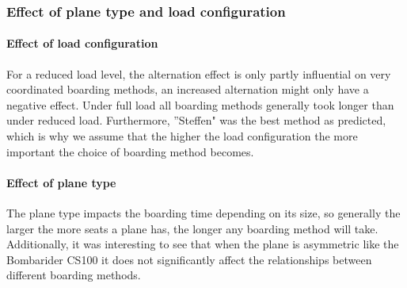 \documentclass[11pt]{article}
\begin{document}
 
 
 \subsubsection{Effect of plane type and load configuration}
 \paragraph{Effect of load configuration}
 For a reduced load level, the alternation effect is only partly influential on very coordinated boarding methods, an increased alternation might only have a negative effect. Under full load all boarding methods generally took longer than under reduced load. Furthermore, ''Steffen" was the best method as predicted, which is why we assume that the higher the load configuration the more important the choice of boarding method becomes.
 
 \paragraph{Effect of plane type}
 The plane type impacts the boarding time depending on its size, so generally the larger the more seats a plane has, the longer any boarding method will take. Additionally, it was interesting to see that when the plane is asymmetric like the Bombarider CS100 it does not significantly affect the relationships between different boarding methods.
 
\end{document}
